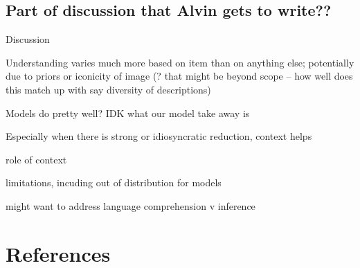 \documentclass[10pt, letterpaper]{article}
\begin{document}
\subsection{Part of discussion that Alvin gets to
write??}\label{part-of-discussion-that-alvin-gets-to-write}

Discussion

Understanding varies much more based on item than on anything else;
potentially due to priors or iconicity of image (? that might be beyond
scope -- how well does this match up with say diversity of descriptions)

Models do pretty well? IDK what our model take away is

Especially when there is strong or idiosyncratic reduction, context
helps

role of context

limitations, incuding out of distribution for models

might want to address language comprehension v inference

\section{References}\label{references}

\setlength{\parindent}{-0.1in} 
\setlength{\leftskip}{0.125in}

\noindent
\end{document}
